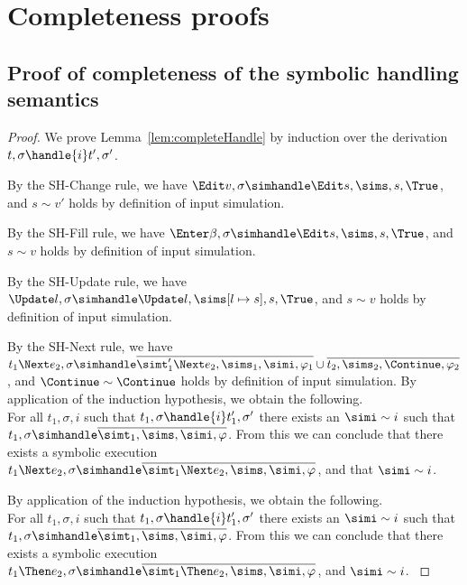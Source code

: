 

\section{Completeness proofs}
\label{sec:completeness-proofs}

\subsection{Proof of completeness of the symbolic handling semantics}
\begin{proof}

  We prove Lemma~\ref{lem:completeHandle} by induction over the derivation $t,\sigma\handle{i}t',\sigma'$.

  {
  By the SH-Change rule, we have $\Edit v,\sigma\simhandle\Edit s,\sims,s,\True$, and $s\sim v'$ holds by definition of input simulation.
  }

  {
    By the SH-Fill rule, we have $\Enter \beta ,\sigma\simhandle\Edit s,\sims,s,\True$, and $s\sim v$ holds by definition of input simulation.
  }

  {
    By the SH-Update rule, we have $\Update l,\sigma\simhandle\Update l ,\sims[l\mapsto s],s,\True$, and $s\sim v$ holds by definition of input simulation.
   }


    {
      By the SH-Next rule, we have $t_1\Next e_2,\sigma\simhandle\overline{\simt_1'\Next e_2,\sims_1,\simi,\phi_1}\cup\overline{t_2,\sims_2,\Continue,\phi_2}$, and $\Continue \sim \Continue$ holds by definition of input simulation.
    }
    {
    By application of the induction hypothesis, we obtain the following.\\
    For all $t_1,\sigma,i$ such that $t_1,\sigma\handle{i}t_1',\sigma'$ there exists an $\simi\sim i$ such that $t_1,\sigma\simhandle\overline{\simt_1,\sims,\simi,\phi}$.
    From this we can conclude that there exists a symbolic execution $t_1\Next e_2,\sigma\simhandle \overline{\simt_1\Next e_2,\sims,\simi,\phi}$, and that $\simi\sim i$.
    }



  {
  By application of the induction hypothesis, we obtain the following.\\
  For all $t_1,\sigma,i$ such that $t_1,\sigma\handle{i}t_1',\sigma'$ there exists an $\simi\sim i$ such that $t_1,\sigma\simhandle \overline{\simt_1,\sims,\simi,\phi}$.
  From this we can conclude that there exists a symbolic execution $t_1\Then e_2,\sigma\simhandle \overline{\simt_1\Then e_2,\sims,\simi,\phi}$, and $\simi\sim i$.
  }



\end{proof}
